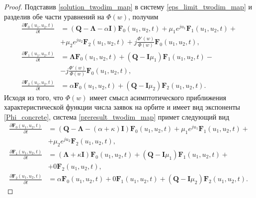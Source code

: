 \begin{proof}
	Подставив \eqref{solution_twodim_map} в систему \eqref{eps_limit_twodim_map} и разделив обе части уравнений на $\Phi(w)$, получим
	\begin{equation} \label{preresult_twodim_map}
	\begin{split}
		\frac{{\partial \boldsymbol{F}_{0}(u_{1},u_{2},t)}}{{\partial t}} &= (\boldsymbol{Q}-\boldsymbol{\Lambda}-\alpha\boldsymbol{I})\boldsymbol{F}_{0}(u_{1},u_{2},t) + \mu_{1} e^{ju_{1}}\boldsymbol{F}_{1}(u_{1},u_{2},t)  + \\  &+ \mu_{2}e^{ju_{2}}\boldsymbol{F}_{2}(u_{1},u_{2},t) + j\frac{\Phi'(w) }{\Phi(w)}
		 \boldsymbol{F}_{0}(u_{1},u_{2},t),
		\\
		\frac{{\partial \boldsymbol{F}_{1}(u_{1},u_{2},t)}}{{\partial t}} &= \boldsymbol{\Lambda} \boldsymbol{F}_{0}(u_{1},u_{2},t) +  (\boldsymbol{Q} - \boldsymbol{I}\mu_{1})\boldsymbol{F}_{1}(u_{1},u_{2},t) -\\ &- j\frac{\Phi'(w) }{\Phi(w)}
		 \boldsymbol{F}_{0}(u_{1},u_{2},t),
		\\
		\frac{{\partial \boldsymbol{F}_{2}(u_{1},u_{2},t)}}{{\partial t}} &= \alpha \boldsymbol{F}_{0}(u_{1},u_{2},t) + (\boldsymbol{Q} - \boldsymbol{I}\mu_{2})\boldsymbol{F}_{2}(u_{1},u_{2},t).
	\end{split}
	\end{equation}  
	Исходя из того, что  $\Phi(w)$ имеет смысл асимптотического приближения характеристической функции числа заявок на орбите и имеет вид экспоненты \eqref{Phi_concrete}, система \eqref{preresult_twodim_map} примет следующий вид
	\begin{equation} \label{result_twodim_map}
		\begin{split}
			\frac{{\partial \boldsymbol{F}_{0}(u_{1},u_{2},t)}}{{\partial t}} &= (\boldsymbol{Q}-\boldsymbol{\Lambda}-(\alpha + \kappa)\boldsymbol{I})\boldsymbol{F}_{0}(u_{1},u_{2},t) + \mu_{1} e^{ju_{1}}\boldsymbol{F}_{1}(u_{1},u_{2},t)  + \\  &+ \mu_{2}e^{ju_{2}}\boldsymbol{F}_{2}(u_{1},u_{2},t),
			\\
			\frac{{\partial \boldsymbol{F}_{1}(u_{1},u_{2},t)}}{{\partial t}} &= (\boldsymbol{\Lambda} + \kappa\boldsymbol{I}) \boldsymbol{F}_{0}(u_{1},u_{2},t) +  (\boldsymbol{Q} - \boldsymbol{I}\mu_{1})\boldsymbol{F}_{1}(u_{1},u_{2},t) + \\&+ 0\boldsymbol{F}_{2}(u_{1},u_{2},t),
			\\
			\frac{{\partial \boldsymbol{F}_{2}(u_{1},u_{2},t)}}{{\partial t}} &= \alpha \boldsymbol{F}_{0}(u_{1},u_{2},t) + 0\boldsymbol{F}_{1}(u_{1},u_{2},t) +  (\boldsymbol{Q} - \boldsymbol{I}\mu_{2})\boldsymbol{F}_{2}(u_{1},u_{2},t).
		\end{split}
	\end{equation}  


\end{proof}
